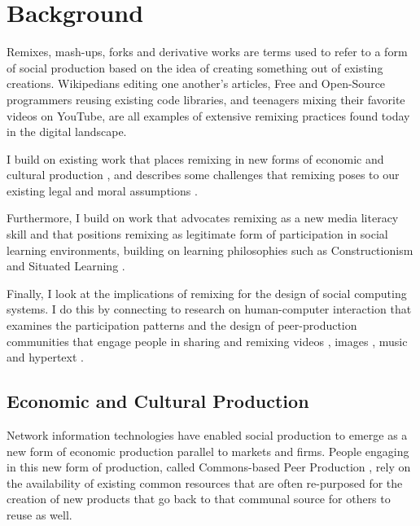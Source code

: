 \chapter{Background}

Remixes, mash-ups, forks and derivative works are terms used to refer to a form of social production based on the idea of creating something out of existing creations.
Wikipedians editing one another's articles, Free and Open-Source programmers reusing existing code libraries, and teenagers mixing their favorite videos on YouTube, are all examples of extensive remixing practices found today in the digital landscape.

I build on existing work that places remixing in new forms of economic and cultural production \citep{benkler_wealth_2006, jenkins_convergence_2006,manovich_remix_2005,sinnreich_ethics_2009}, and describes some challenges that remixing poses to our existing legal and moral assumptions \citep{lessig_remix:_2008, posner_little_2007}.

Furthermore, I build on work that advocates remixing as a new media literacy skill \citep{ito_hanging_2010, jenkins_confronting_2009, livingstone_taking_2008, perkel_copy_2008} and that positions remixing as legitimate form of participation in social learning environments, building on learning philosophies such as Constructionism \citep{papert_mindstorms_1980} and Situated Learning \citep{lave_situated_1991}.

Finally, I look at the implications of remixing for the design of social computing systems. I do this by connecting to research on human-computer interaction that examines the participation patterns and the design of peer-production communities that engage people in sharing and remixing videos \citep{diakopoulos_evolution_2007,shaw_community_2006}, images \citep{seneviratne_policy-aware_2009}, music \citep{cheliotis_analysis_2009} and hypertext \citep{viegas_studying_2004}.

\section{Economic and Cultural Production}

Network information technologies have enabled social production to emerge as a new form of economic production parallel to markets and firms.
People engaging in this new form of production, called Commons-based Peer Production \citep{benkler_coases_2002}, rely on the availability of existing common resources that are often re-purposed for the creation of new products that go back to that communal source for others to reuse as well.

